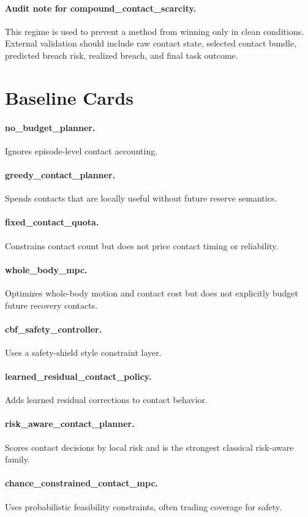 \documentclass{article}
\begin{document}
\paragraph{Audit note for compound\_contact\_scarcity.} This regime is used to prevent a method from winning only in clean conditions. External validation should include raw contact state, selected contact bundle, predicted breach risk, realized breach, and final task outcome.
\clearpage
\section{Baseline Cards}
\paragraph{no\_budget\_planner.} Ignores episode-level contact accounting.
\paragraph{greedy\_contact\_planner.} Spends contacts that are locally useful without future reserve semantics.
\paragraph{fixed\_contact\_quota.} Constrains contact count but does not price contact timing or reliability.
\paragraph{whole\_body\_mpc.} Optimizes whole-body motion and contact cost but does not explicitly budget future recovery contacts.
\paragraph{cbf\_safety\_controller.} Uses a safety-shield style constraint layer.
\paragraph{learned\_residual\_contact\_policy.} Adds learned residual corrections to contact behavior.
\paragraph{risk\_aware\_contact\_planner.} Scores contact decisions by local risk and is the strongest classical risk-aware family.
\paragraph{chance\_constrained\_contact\_mpc.} Uses probabilistic feasibility constraints, often trading coverage for safety.
\end{document}
